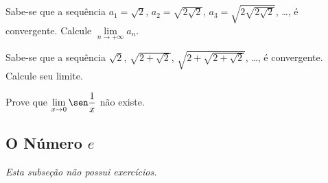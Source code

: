 \begin{exercicio}[4]
Sabe-se que a sequência $a_1 = \sqrt{2}$, $a_2 = \sqrt{2\sqrt{2}}$, $a_3 = \sqrt{2\sqrt{2\sqrt{2}}}$, \dots, é convergente. Calcule $\lim\limits_{n \to +\infty} a_n$.
\end{exercicio}

\begin{exercicio}[5]
Sabe-se que a sequência $\sqrt{2}$, $\sqrt{2 + \sqrt{2}}$, $\sqrt{2 + \sqrt{2 + \sqrt{2}}}$, \dots, é convergente. Calcule seu limite.
\end{exercicio}

\begin{exercicio}[6]
Prove que $\lim\limits_{x \to 0} \sen\dfrac{1}{x}$ não existe.
\end{exercicio}

\clearpage

\subsection{O Número $e$}
\textit{Esta subseção não possui exercícios.}
